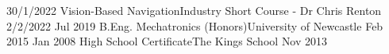 %
%
%

 \begin{education}
	\school
		{30/1/2022}	{Vision-Based Navigation}{Industry Short Course - Dr Chris Renton}
		{2/2/2022}
	\emptySeparator
	\school
		{Jul 2019}	{B.Eng. Mechatronics (Honors)}{University of Newcastle}
		{Feb 2015}
	\emptySeparator
	\school
	{Jan 2008}	{High School Certificate}{The Kings School}
	{Nov 2013}
	\emptySeparator
 \end{education}